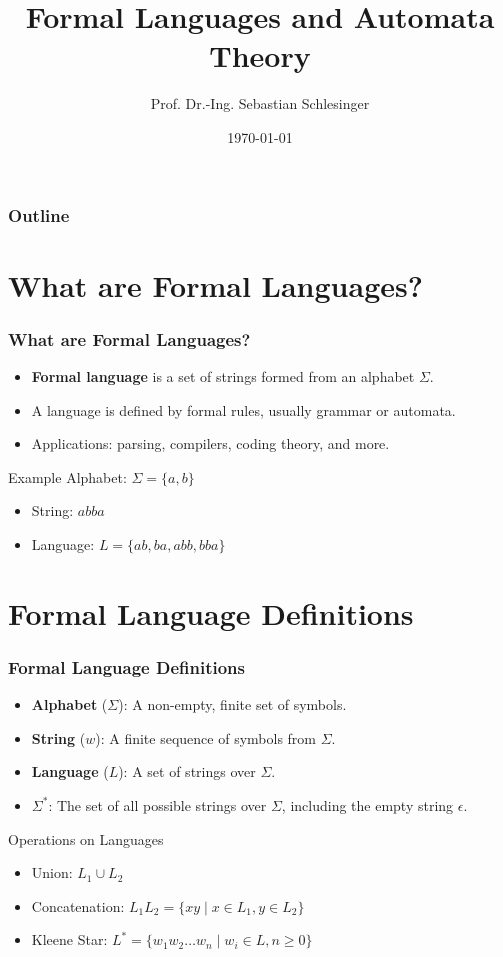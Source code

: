 \documentclass{beamer}
\title[Formal Languages and Automata Theory]{Formal Languages and Automata Theory}
\author[Sebastian Schlesinger]{Prof. Dr.-Ing. Sebastian Schlesinger}
\institute[HWR Berlin]{Berlin School for Economics and Law}
\date{\today}
\begin{document}
 \begin{frame}
\titlepage
\end{frame}



\begin{frame}
  \frametitle{Outline}
  \tableofcontents
\end{frame}
\section{What are Formal Languages?}
\begin{frame}
    \frametitle{What are Formal Languages?}
    \begin{itemize}
        \item \textbf{Formal language} is a set of strings formed from an alphabet $\Sigma$.
        \item A language is defined by formal rules, usually grammar or automata.
        \item Applications: parsing, compilers, coding theory, and more.
    \end{itemize}
    \pause
    \begin{block}{Example}
        Alphabet: $\Sigma = \{a, b\}$
        \begin{itemize}
            \item String: $abba$
            \item Language: $L = \{ab, ba, abb, bba\}$
        \end{itemize}
    \end{block}
\end{frame}

\section{Formal Language Definitions}
\begin{frame}
    \frametitle{Formal Language Definitions}
    \begin{itemize}
        \item \textbf{Alphabet} ($\Sigma$): A non-empty, finite set of symbols.
        \item \textbf{String} ($w$): A finite sequence of symbols from $\Sigma$.
        \item \textbf{Language} ($L$): A set of strings over $\Sigma$.
        \item $\Sigma^*$: The set of all possible strings over $\Sigma$, including the empty string $\epsilon$.
    \end{itemize}
    \pause
    \begin{block}{Operations on Languages}
        \begin{itemize}
            \item Union: $L_1 \cup L_2$
            \item Concatenation: $L_1 L_2 = \{xy \mid x \in L_1, y \in L_2 \}$
            \item Kleene Star: $L^* = \{ w_1 w_2 \ldots w_n \mid w_i \in L, n \geq 0 \}$
        \end{itemize}
    \end{block}
\end{frame}
\end{document}
